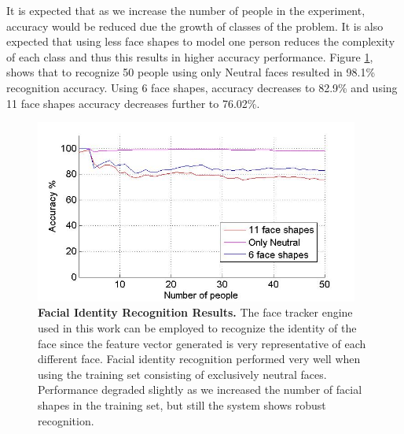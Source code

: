 \documentclass[]{article}
\begin{document}
It is expected that as we increase the number of people in the experiment, accuracy would be reduced due the growth of
classes of the problem. It is also expected  that using less face shapes to model one person reduces the complexity of
each class and thus this results in higher accuracy performance. Figure \ref{identityRecognition}, shows that to recognize 50
people using only Neutral faces resulted in 98.1\% recognition accuracy.  Using 6 face shapes, accuracy decreases to
82.9\% and using 11 face shapes accuracy decreases further to 76.02\%.


\begin{figure}[ht]
\begin{center}
\vspace{-3mm}
\includegraphics[width=0.95\textwidth]{figures/peopleRecognition4.jpg}
\end{center}
\caption{\textbf{Facial Identity Recognition Results.} The face tracker engine used in this work can be employed 
to recognize the identity of the face since the feature vector generated is very representative  of each different face.
Facial identity recognition performed very well when using the training set consisting of exclusively neutral faces. 
Performance degraded slightly as we increased the number of facial shapes in the training set, but still the system shows 
robust  recognition.}
\label{identityRecognition}
\end{figure}
\end{document}
